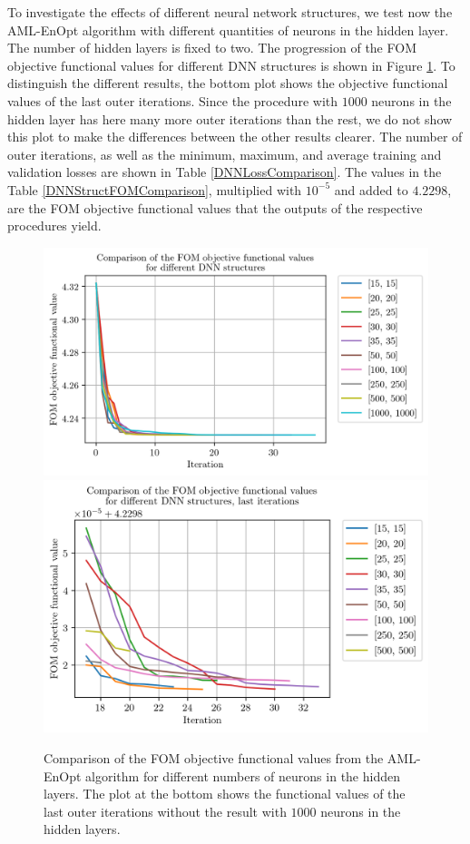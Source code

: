 To investigate the effects of different neural network structures, we test now the AML-EnOpt algorithm with different quantities of neurons in the hidden layer. The number of hidden layers is fixed to two. The progression of the FOM objective functional values for different DNN structures is shown in Figure \ref{DNNStructComparison}. To distinguish the different results, the bottom plot shows the objective functional values of the last outer iterations. Since the procedure with $1000$ neurons in the hidden layer has here many more outer iterations than the rest, we do not show this plot to make the differences between the other results clearer. The number of outer iterations, as well as the minimum, maximum, and average training and validation losses are shown in Table \ref{DNNLossComparison}. The values in the Table \ref{DNNStructFOMComparison}, multiplied with $10^{-5}$ and added to $4.2298$, are the FOM objective functional values that the outputs of the respective procedures yield.\\

\begin{figure}
\centering
\includegraphics{Plots/DNNStruct.png}
\includegraphics{Plots/DNNStructLastIter.png}
\caption{\label{DNNStructComparison}Comparison of the FOM objective functional values from the AML-EnOpt algorithm for different numbers of neurons in the hidden layers. The plot at the bottom shows the functional values of the last outer iterations without the result with $1000$ neurons in the hidden layers.}
\end{figure}


